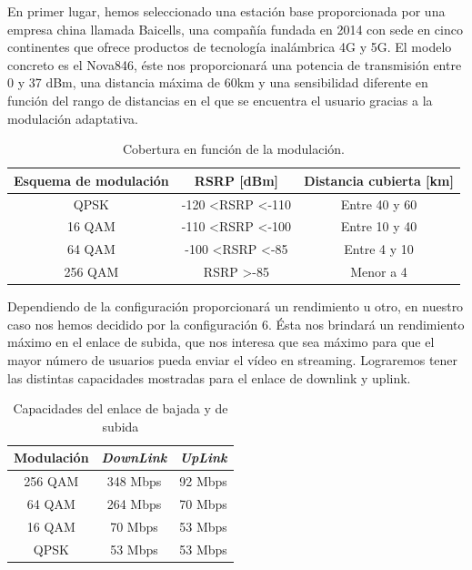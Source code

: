 En primer lugar, hemos seleccionado una estación base proporcionada por una empresa china llamada Baicells, una compañía fundada en 2014 con sede en cinco continentes que ofrece productos de tecnología inalámbrica 4G y 5G. El modelo concreto es el Nova846, éste nos proporcionará una potencia de transmisión entre 0 y 37 dBm, una distancia máxima de 60km y una sensibilidad diferente en función del rango de distancias en el que se encuentra el usuario gracias a la modulación adaptativa.\\

\begin{table}[H]
\centering
\begin{tabular}{|c|c|c|}
\hline
\textbf{Esquema de modulación} & \textbf{RSRP {[}dBm{]}}            & \textbf{Distancia cubierta {[}km{]}} \\ \hline \hline
QPSK                           & -120 \textless RSRP \textless -110 & Entre 40 y 60                        \\ \hline
16 QAM                         & -110 \textless RSRP \textless -100 & Entre 10 y 40                        \\ \hline
64 QAM                         & -100 \textless RSRP \textless -85  & Entre 4 y 10                         \\ \hline
256 QAM                        & RSRP \textgreater -85              & Menor a 4                            \\ \hline
\end{tabular}
\caption{Cobertura en función de la modulación.}
\label{cobertura}
\end{table}

Dependiendo de la configuración proporcionará un rendimiento u otro, en nuestro caso nos hemos decidido por la configuración 6. Ésta nos brindará un rendimiento máximo en el enlace de subida, que nos interesa que sea máximo para que el mayor número de usuarios pueda enviar el vídeo en streaming. Lograremos tener las distintas capacidades mostradas para el enlace de downlink y uplink.\\

\begin{table}[H]
\centering
\begin{tabular}{|c||c|c|}
\hline
\textbf{Modulación} & \textit{\textbf{DownLink}} & \textit{\textbf{UpLink}} \\ \hline \hline
256 QAM             & 348 Mbps                   & 92 Mbps                  \\ \hline
64 QAM              & 264 Mbps                   & 70 Mbps                  \\ \hline
16 QAM              & 70 Mbps                    & 53 Mbps                  \\ \hline
QPSK                & 53 Mbps                    & 53 Mbps                  \\ \hline
\end{tabular}
\caption{Capacidades del enlace de bajada y de subida}
\label{capacidad}
\end{table}

